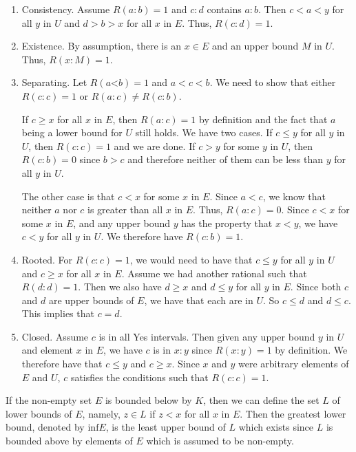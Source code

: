 \documentclass[12pt]{article}
\theoremstyle{remark}
\newcommand{\lt}{\mathord{<}}
\begin{document}
\begin{enumerate}
    \item Consistency. Assume $R(a:b)=1$ and $c:d$ contains $a:b$. Then $c < a < y$ for all $y$ in $U$ and $d > b > x$ for all $x$ in $E$. Thus, $R(c:d) = 1$.
    \item Existence. By assumption, there is an $x \in E$ and an upper bound $M$ in $U$. Thus, $R(x:M) = 1$. 
    \item Separating. Let $R(a\lt b)=1$ and $a < c< b$. We need to show that either $R(c:c)=1$ or $R(a:c) \neq R(c:b)$. 
    
    If $c \geq x$ for all $x$ in $E$, then $R(a:c)=1$ by definition and the fact that $a$ being a lower bound for $U$ still holds. We have two cases.  If $c \leq y$ for all $y$ in $U$, then $R(c:c)=1$ and we are done. If $c > y$ for some $y$ in $U$, then $R(c:b) = 0$ since $b > c$ and therefore neither of them can be less than $y$ for all $y$ in $U$. 
    
    The other case is that $c < x$ for some $x$ in $E$. Since $a < c$, we know that neither $a$ nor $c$ is greater than all $x$ in $E$. Thus, $R(a:c) = 0$. Since $c < x$ for some $x$ in $E$, and any upper bound $y$ has the property that $x < y$, we have $c < y$ for all $y$ in $U$. We therefore have $R(c:b)=1$.
    
    \item Rooted. For $R(c:c)=1$, we would need to have that $c \leq y$ for all $y$ in $U$ and $c \geq x$ for all $x$ in $E$. Assume we had another rational such that $R(d:d) = 1$. Then we also have $d \geq x$ and $d \leq y$ for all $y$ in $E$. Since both $c$ and $d$ are upper bounds of $E$, we have that each are in $U$. So $c \leq d$ and $d \leq c$. This implies that $c = d$. 
    \item Closed. Assume $c$ is in all Yes intervals. Then given any upper bound $y$ in $U$ and element $x$ in $E$, we have $c$ is in $x:y$ since $R(x:y)=1$ by definition. We therefore have that $c \leq y$ and $c \geq x$. Since $x$ and $y$ were arbitrary elements of $E$ and $U$, $c$ satisfies the conditions such that $R(c:c)=1$.
\end{enumerate}

If the non-empty set $E$ is bounded below by $K$, then we can define the set $L$ of lower bounds of $E$, namely, $z \in L$ if $z < x$ for all $x$ in $E$. Then the greatest lower bound, denoted by $\mathrm{inf} E$, is the least upper bound of $L$ which exists since $L$ is bounded above by elements of $E$ which is assumed to be non-empty. 
\end{document}
